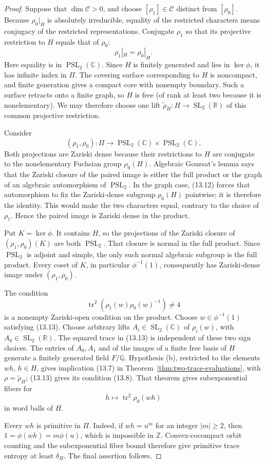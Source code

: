 \documentclass[11pt,reqno]{amsart}
\theoremstyle{definition}
\theoremstyle{remark}
\newcommand{\R}{\mathbb R}
\newcommand{\C}{\mathbb C}
\newcommand{\Q}{\mathbb Q}
\newcommand{\Z}{\mathbb Z}
\newcommand{\Tr}{\operatorname{tr}}
\newcommand{\SL}{\operatorname{SL}}
\newcommand{\PSL}{\operatorname{PSL}}
\begin{document}
\begin{proof}
Suppose that \(\dim\mathcal C>0\), and choose
\([\rho_1]\in\mathcal C\) distinct from \([\rho_0]\).  Because
\(\rho_0|_H\) is absolutely irreducible, equality of the restricted
characters means conjugacy of the restricted representations.  Conjugate
\(\rho_1\) so that its projective restriction to \(H\) equals that of
\(\rho_0\):
\[
 \rho_1|_H=\rho_0|_H.
\tag{13.12}
\]
Here equality is in \(\PSL_2(\C)\).  Since \(H\) is finitely generated and
lies in \(\ker\phi\), it has infinite index in \(\Pi\).  The covering
surface corresponding to \(H\) is noncompact, and finite generation gives
a compact core with nonempty boundary.  Such a surface retracts onto a
finite graph, so \(H\) is free (of rank at least two because it is
nonelementary).  We may therefore choose one lift
\(\widetilde\rho_H\colon H\to\SL_2(\R)\) of this common projective
restriction.

Consider
\[
 (\rho_1,\rho_0)\colon
 \Pi\longrightarrow\PSL_2(\C)\times\PSL_2(\C).
\]
Both projections are Zariski dense because their restrictions to \(H\)
are conjugate to the nonelementary Fuchsian group \(\rho_0(H)\).
Algebraic Goursat's lemma says that the Zariski closure of the paired image
is either the full product or the graph of an algebraic automorphism of
\(\PSL_2\).  In the graph case, (13.12) forces that automorphism to fix the
Zariski-dense subgroup \(\rho_0(H)\) pointwise; it is therefore the
identity.  This would make the two characters equal, contrary to the choice
of \(\rho_1\).  Hence the paired image is Zariski dense in the product.

Put \(K=\ker\phi\).  It contains \(H\), so the projections of the Zariski
closure of \((\rho_1,\rho_0)(K)\) are both \(\PSL_2\).  That closure is
normal in the full product.  Since \(\PSL_2\) is adjoint and simple, the
only such normal algebraic subgroup is the full product.  Every coset of
\(K\), in particular \(\phi^{-1}(1)\), consequently has Zariski-dense
image under \((\rho_1,\rho_0)\).

The condition
\[
 \Tr^2\!\left(\rho_1(w)\rho_0(w)^{-1}\right)\ne4
\tag{13.13}
\]
is a nonempty Zariski-open condition on the product.  Choose
\(w\in\phi^{-1}(1)\) satisfying (13.13).  Choose arbitrary lifts
\(A_i\in\SL_2(\C)\) of \(\rho_i(w)\), with \(A_0\in\SL_2(\R)\).
The squared trace in (13.13) is independent of these two sign choices.
The entries of \(A_0,A_1\) and of the images of a finite free basis of
\(H\) generate a finitely generated field \(F/\Q\).
Hypothesis (b), restricted to the
elements \(wh\), \(h\in H\), gives implication (13.7) in
Theorem~\ref{thm:two-trace-evaluations}, with
\(\rho=\widetilde\rho_H\); (13.13) gives its condition (13.8).  That theorem
gives subexponential fibers for
\[
 h\longmapsto\Tr^2\rho_0(wh)
\]
in word balls of \(H\).

Every \(wh\) is primitive in \(\Pi\).  Indeed, if \(wh=u^m\) for an integer
\(|m|\ge2\), then \(1=\phi(wh)=m\phi(u)\), which is impossible in \(\Z\).
Convex-cocompact orbit counting and the subexponential fiber bound therefore
give primitive trace entropy at least \(\delta_H\).  The final assertion
follows.
\end{proof}
\end{document}
